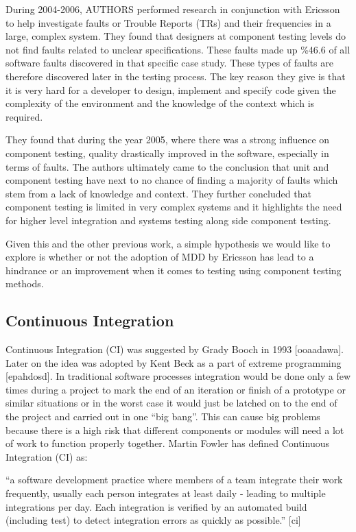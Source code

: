\documentclass[fina_report_innit.tex]{subfiles}
\begin{document}
During 2004-2006, AUTHORS performed research in conjunction with Ericsson to help investigate faults or Trouble Reports (TRs) and their frequencies in a large, complex system. They found that designers at component testing levels do not find faults related to unclear specifications. These faults made up \%46.6 of all software faults discovered in that specific case study. These types of faults are therefore discovered later in the testing process. The key reason they give is that it is very hard for a developer to design, implement and specify code given the complexity of the environment and the knowledge of the context which is required. 

They found that during the year 2005, where there was a strong influence on component testing, quality drastically improved in the software, especially in terms of faults. The authors ultimately came to the conclusion that unit and component testing have next to no chance of finding a majority of faults which stem from a lack of knowledge and context. They further concluded that component testing is limited in very complex systems and it highlights the need for higher level integration and systems testing along side component testing.

Given this and the other previous work, a simple hypothesis we would like to explore is whether or not the adoption of MDD by Ericsson has lead to a hindrance or an improvement when it comes to testing using component testing methods.

\subsection{Continuous Integration}
Continuous Integration (CI) was suggested by Grady Booch in 1993 [ooaadawa]. Later on the idea was adopted by Kent Beck as a part of extreme programming [epahdosd]. In traditional software processes integration would be done only a few times during a project to mark the end of an iteration or finish of a prototype or similar situations or in the worst case it would just be latched on to the end of the project and carried out in one “big bang”. This can cause big problems because there is a high risk that different components or modules will need a lot of work to function properly together. Martin Fowler has defined Continuous Integration (CI) as: 

“a software development practice where members of a team  integrate  their  work  frequently,  usually  each person  integrates  at  least  daily  -  leading  to  multiple integrations per day. Each integration is verified by an automated build (including test) to detect integration errors as quickly as possible.” [ci]
\end{document}
